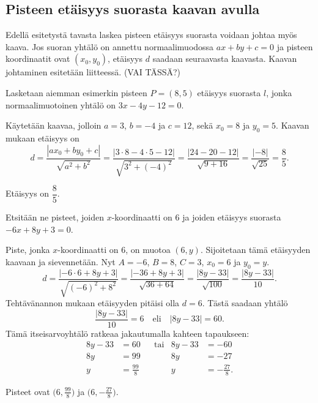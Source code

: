 \subsection*{Pisteen etäisyys suorasta kaavan avulla}

Edellä esitetystä tavasta laskea pisteen etäisyys suorasta voidaan johtaa myös kaava.
Jos suoran yhtälö on annettu normaalimuodossa $ax+by+c=0$ ja pisteen koordinaatit ovat $(x_0, y_0)$, etäisyys $d$ saadaan seuraavasta kaavasta.
Kaavan johtaminen esitetään liitteessä. (VAI TÄSSÄ?) 

\begin{esimerkki} Lasketaan aiemman esimerkin pisteen $P=(8, 5)$ etäisyys suorasta $l$, jonka normaalimuotoinen yhtälö on $3x-4y-12=0$.
\begin{esimratk}
Käytetään kaavaa, jolloin $a=3$, $b=-4$ ja $c=12$, sekä $x_0=8$ ja $y_0=5$. Kaavan mukaan etäisyys on
\[
d=\frac{|ax_0+by_0+c|}{\sqrt{a^2+b^2}}
=\frac{|3\cdot 8-4\cdot 5-12|}{\sqrt{3^2+(-4)^2}}
=\frac{|24-20-12|}{\sqrt{9+16}}=\frac{|-8|}{\sqrt{25}}
=\frac{8}{5}.
\]
\end{esimratk}
\begin{esimvast}
Etäisyys on $\dfrac{8}{5}$.
\end{esimvast}
\end{esimerkki}

\begin{esimerkki} Etsitään ne pisteet, joiden $x$-koordinaatti on 6 ja joiden etäisyys suorasta $-6x+8y+3=0$.
\begin{esimratk}
Piste, jonka $x$-koordinaatti on 6, on muotoa $(6, y)$. Sijoitetaan tämä etäisyyden kaavaan ja sievennetään.
Nyt $A=-6$, $B=8$, $C=3$, $x_0=6$ ja $y_0=y$.
\[
d=\frac{|-6\cdot 6+8y+3|}{\sqrt{(-6)^2+8^2}}
=\frac{|-36+8y+3|}{\sqrt{36+64}}
=\frac{|8y-33|}{\sqrt{100}}
=\frac{|8y-33|}{10}.
\]
Tehtävänannon mukaan etäisyyden pitäisi olla $d=6$. Tästä saadaan yhtälö
\[
\frac{|8y-33|}{10}=6 \quad \text{eli} \quad |8y-33|=60.
\]
Tämä itseisarvoyhtälö ratkeaa jakautumalla kahteen tapaukseen:
\begin{align*}
8y-33 & =60 & &\text{tai} & 8y-33 & =-60 \\
8y & =99 & & & 8y & =-27 \\
y & =\frac{99}{8} & & & y & =-\frac{27}{8}.
\end{align*}
\end{esimratk}
\begin{esimvast}
Pisteet ovat $\bigl(6, \frac{99}{8}\bigr)$ ja $\bigl(6, -\frac{27}{8}\bigr)$.
\end{esimvast}
\end{esimerkki}



